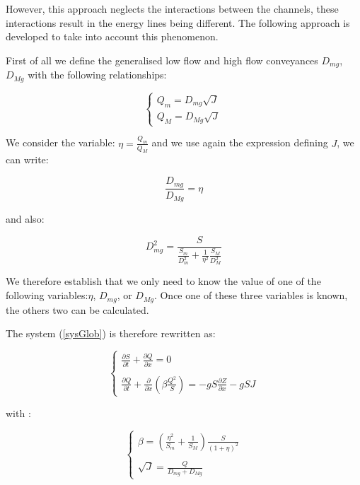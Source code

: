 However, this approach neglects the interactions between the channels, these interactions result in the energy lines being different. The following approach is developed to take into account this phenomenon.

First of all we define the generalised low flow and high flow conveyances $D_{mg}$, $D_{Mg}$ with the following relationships:

\begin{equation}
 \left \lbrace
  \begin{array}{l}
    Q_m =  D_{mg} \sqrt{J}\\
    Q_M =  D_{Mg} \sqrt{J}
  \end{array}
 \right.
\end{equation}

We consider the variable: $\eta = \frac{Q_m}{Q_M}$ and we use again the expression defining $J$, we can write:

\begin{equation}
    \frac{D_{mg}}{D_{Mg}} = \eta
\end{equation}

and also:

\begin{equation}
     D_{mg}^2 = \frac{S}{\displaystyle  \frac{S_m}{D_{m}^2}+ \frac{1}{\eta^2}\frac{S_M}{D_{M}^2}}
\end{equation}

We therefore establish that we only need to know the value of one of the following variables:$\eta$, $D_{mg}$, or $D_{Mg}$. Once one of these three variables is known, the others two can be calculated.

The system (\ref{sysGlob}) is therefore rewritten as:

\begin{equation}
 \label{sysFin}
 \left \lbrace
  \begin{array}{l}
    \frac{\partial{S}}{\partial{t}} + \frac{\partial{Q}}{\partial{x}} = 0 \\
    \\
    \frac{\partial{Q}}{\partial{t}} + \frac{\partial}{\partial{x}} \left ( \beta \frac{Q^2}{S} \right ) = -g S \frac{\partial{Z}}{\partial{x}} - g S J
  \end{array}
 \right.
\end{equation}

with :

\begin{equation}
 \left \lbrace
  \begin{array}{l}
    \beta = \left ( \frac{\eta^2}{S_m} + \frac{1}{S_M} \right ) \frac{S}{(1+\eta)^2} \\
    \\
    \sqrt{J} = \frac{Q}{D_{mg}+D_{Mg}}
  \end{array}
 \right.
\end{equation}

